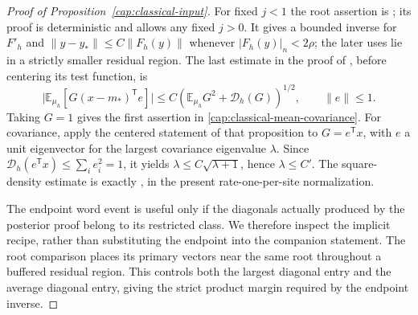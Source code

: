 \begin{proof}[Proof of Proposition~\ref{cap:classical-input}]
For fixed $j<1$ the root assertion is
\cite[Lemma~5.7]{AcceptedGap}; its proof is deterministic and allows any
fixed \(j>0\). It gives a bounded inverse for \(F'_h\) and
\(\|y-y_*\|\le C\|F_h(y)\|\) whenever \(|F_h(y)|_n<2\rho\);
the later uses lie in a strictly smaller residual region. The last estimate
in the proof of \cite[Proposition~7.2]{AcceptedGap}, before centering its
test function, is
\begin{equation}\label{cap:uncentered-directional}
 \big|\mathbb E_{\mu_h}[G(x-m_*)^{\mathsf T}e]\big|
 \le C\left(\mathbb E_{\mu_h}G^2+\mathcal D_h(G)\right)^{1/2},
 \qquad \|e\|\le1.
\end{equation}
Taking $G=1$ gives the first assertion in
\eqref{cap:classical-mean-covariance}. For covariance, apply the centered
statement of that proposition to $G=e^{\mathsf T}x$, with $e$ a unit
eigenvector for the largest covariance eigenvalue $\lambda$. Since $\mathcal
D_h(e^{\mathsf T}x)\le\sum_i e_i^2=1$, it yields $\lambda\le
C\sqrt{\lambda+1}$, hence $\lambda\le C'$. The square-density estimate is
exactly \cite[Proposition~7.3]{AcceptedGap}, in the present rate-one-per-site
normalization.

The endpoint word event is useful only if the diagonals actually produced by
the posterior proof belong to its restricted class. We therefore inspect the
implicit recipe, rather than substituting the endpoint into the companion
statement. The root comparison places its primary vectors near the same root
throughout a buffered residual region. This controls both the largest diagonal
entry and the average diagonal entry, giving the strict product margin
required by the endpoint inverse.



\end{proof}
